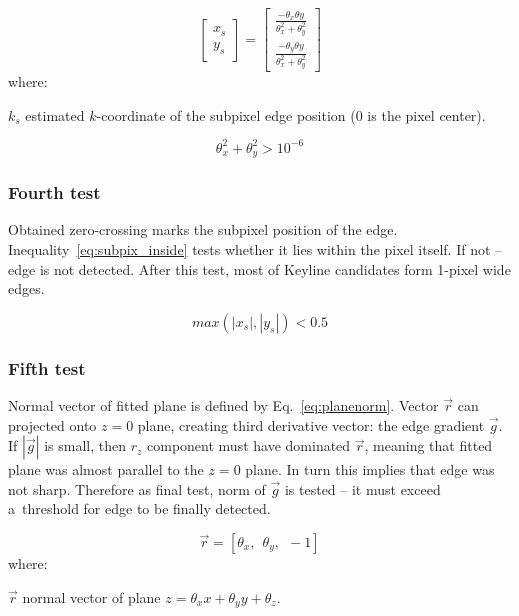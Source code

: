 \begin{equation}
\begin{bmatrix}
x_s \\
y_s 
\end{bmatrix} = 
\begin{bmatrix}
\frac{-\theta_{x} \theta{y}}{\theta_x^2 + \theta_y^2} \\
\frac{-\theta_{y} \theta{y}}{\theta_x^2 + \theta_y^2}
\end{bmatrix}
\label{eq:zerocross}
\end{equation}
where:
\begin{eqwhere}[2cm]
	\item[$k_s$] estimated $k$-coordinate of the subpixel edge position (0 is the pixel center).
\end{eqwhere}

\begin{equation}
\theta_{x}^2 + \theta_{y}^2 > 10^{-6}
\label{eq:test3}
\end{equation}

\subsubsection{Fourth test}
\label{edge_fourth}

Obtained zero-crossing marks the subpixel position of the edge. Inequality~\ref{eq:subpix_inside} tests whether it lies within the pixel itself. If not -- edge is not detected. After this test, most of Keyline candidates form 1-pixel wide edges.

\begin{equation}
max(|x_s|, |y_s|) < 0.5
\label{eq:subpix_inside}
\end{equation}

\subsubsection{Fifth test}
\label{edge_fith}

Normal vector of fitted plane is defined by Eq.~\ref{eq:planenorm}. Vector $\vec{r}$ can projected onto $z=0$ plane, creating third derivative vector: the edge gradient $\vec{g}$. If $|\vec{g}|$ is small, then $r_{z}$ component must have dominated $\vec{r}$, meaning that fitted plane was almost parallel to the $z=0$ plane. In turn this implies that edge was not sharp. Therefore as final test, norm of $\vec{g}$ is tested -- it must exceed a~threshold for edge to be finally detected.

\begin{equation}
\vec{r} = [\theta_{x},\ \ \theta_{y},\ \ -1]
\label{eq:planenorm}
\end{equation}
where:
\begin{eqwhere}[2cm]
	\item[$\vec{r}$] normal vector of plane $z = \theta_{x}x + \theta_{y}y + \theta_{z}$.
\end{eqwhere}

